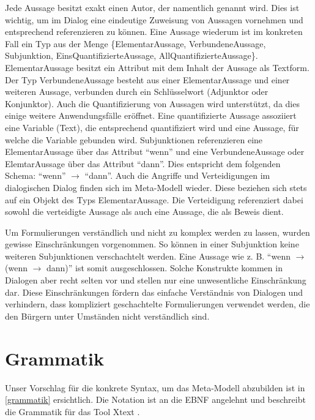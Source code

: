 \documentclass[11pt,a4paper,bibtotocnumbered]{scrreprt}
\begin{document}
Jede Aussage besitzt exakt einen Autor, der namentlich genannt wird.
Dies ist wichtig, um im Dialog eine eindeutige Zuweisung von Aussagen vornehmen und entsprechend referenzieren zu können.
Eine Aussage wiederum ist im konkreten Fall ein Typ aus der Menge \{ElementarAussage, VerbundeneAussage, Subjunktion, EinsQuantifizierteAussage, AllQuantifizierteAussage\}. 
ElementarAussage besitzt ein Attribut mit dem Inhalt der Aussage als Textform.
Der Typ VerbundeneAussage besteht aus einer ElementarAussage und einer weiteren Aussage, verbunden durch ein Schlüsselwort (Adjunktor oder Konjunktor).
Auch die Quantifizierung von Aussagen wird unterstützt, da dies einige weitere Anwendungsfälle eröffnet.
Eine quantifizierte Aussage assoziiert eine Variable (Text), die entsprechend quantifiziert wird und eine Aussage, für welche die Variable gebunden wird.
Subjunktionen referenzieren eine ElementarAussage über das Attribut \enquote{wenn} und eine VerbundeneAussage oder ElemtarAussage über das Attribut \enquote{dann}.
Dies entspricht dem folgenden Schema: \enquote{wenn} $\rightarrow$ \enquote{dann}.
Auch die Angriffe und Verteidigungen im dialogischen Dialog finden sich im Meta-Modell wieder. 
Diese beziehen sich stets auf ein Objekt des Typs ElementarAussage.
Die Verteidigung referenziert dabei sowohl die verteidigte Aussage als auch eine Aussage, die als Beweis dient.

Um Formulierungen verständlich und nicht zu komplex werden zu lassen, wurden gewisse Einschränkungen vorgenommen. 
So können in einer Subjunktion keine weiteren Subjunktionen verschachtelt werden.
Eine Aussage wie z. B. \enquote{wenn $\rightarrow$ (wenn $\rightarrow$ dann)} ist somit ausgeschlossen.
Solche Konstrukte kommen in Dialogen aber recht selten vor und stellen nur eine unwesentliche Einschränkung dar.
Diese Einschränkungen fördern das einfache Verständnis von Dialogen und verhindern, dass kompliziert geschachtelte Formulierungen verwendet werden, die den Bürgern unter Umständen nicht verständlich sind.

\section{Grammatik}

Unser Vorschlag für die konkrete Syntax, um das Meta-Modell abzubilden ist in \autoref{grammatik} ersichtlich.
Die Notation ist an die \ac{EBNF} angelehnt und beschreibt die Grammatik für das Tool Xtext \cite{Xtext}.
\end{document}
